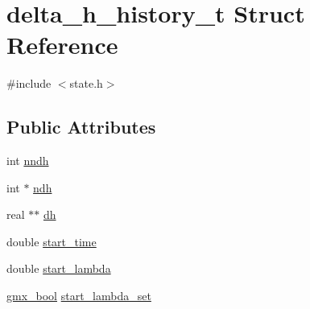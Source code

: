 \hypertarget{structdelta__h__history__t}{\section{delta\-\_\-h\-\_\-history\-\_\-t \-Struct \-Reference}
\label{structdelta__h__history__t}
}


{\ttfamily \#include $<$state.\-h$>$}

\subsection*{\-Public \-Attributes}
\begin{DoxyCompactItemize}
\item 
int \hyperlink{structdelta__h__history__t_aeb890d3af26dd32f31cdd0b3c0229993}{nndh}
\item 
int $\ast$ \hyperlink{structdelta__h__history__t_a04df9ee4a8f1e3fcf235d46e7f156105}{ndh}
\item 
real $\ast$$\ast$ \hyperlink{structdelta__h__history__t_aba616584c2c82c28a384e439a9130850}{dh}
\item 
double \hyperlink{structdelta__h__history__t_afc228f841ee0fdf94bb91c9835012e32}{start\-\_\-time}
\item 
double \hyperlink{structdelta__h__history__t_a0f243e2e9888c9bb93affd3d35772872}{start\-\_\-lambda}
\item 
\hyperlink{include_2types_2simple_8h_a8fddad319f226e856400d190198d5151}{gmx\-\_\-bool} \hyperlink{structdelta__h__history__t_a39363b323810ebaca79ed9e565082089}{start\-\_\-lambda\-\_\-set}
\end{DoxyCompactItemize}


